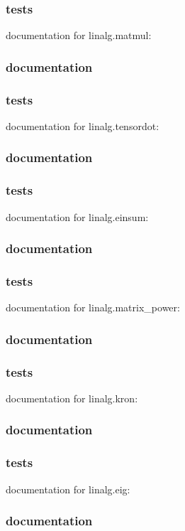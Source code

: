 \documentclass[a4paper,11pt]{article}
\begin{document}
\subsubsection{tests}
documentation for linalg.matmul:

\subsubsection{documentation}
\subsubsection{tests}
documentation for linalg.tensordot:

\subsubsection{documentation}
\subsubsection{tests}
documentation for linalg.einsum:

\subsubsection{documentation}
\subsubsection{tests}
documentation for linalg.matrix\_power:

\subsubsection{documentation}
\subsubsection{tests}
documentation for linalg.kron:

\subsubsection{documentation}
\subsubsection{tests}
documentation for linalg.eig:

\subsubsection{documentation}
\end{document}
